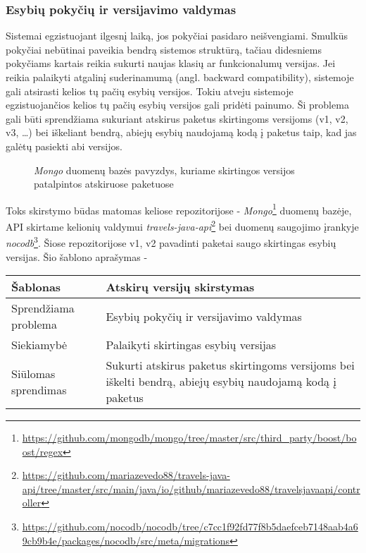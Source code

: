 \subsubsection{Esybių pokyčių ir versijavimo valdymas}
Sistemai egzistuojant ilgesnį laiką, jos pokyčiai pasidaro neišvengiami.
Smulkūs pokyčiai nebūtinai paveikia bendrą sistemos struktūrą, tačiau
didesniems pokyčiams kartais reikia sukurti naujas klasių ar funkcionalumų versijas. Jei reikia palaikyti atgalinį
suderinamumą (angl. backward compatibility), sistemoje gali atsirasti kelios tų pačių esybių versijos.
Tokiu atveju sistemoje egzistuojančios kelios tų pačių esybių versijos gali pridėti painumo.
Ši problema gali būti sprendžiama sukuriant atskirus paketus skirtingoms
versijoms (v1, v2, v3, \ldots) bei iškeliant bendrą, abiejų esybių naudojamą kodą į paketus taip, kad jas galėtų pasiekti abi versijos.
\begin{figure}[H]
    \snugshade
    \endsnugshade
    \caption{\textit{Mongo} duomenų bazės pavyzdys, kuriame skirtingos versijos patalpintos atskiruose paketuose}
\end{figure}
Toks skirstymo būdas matomas keliose repozitorijose - \textit{Mongo}\footnote{\url{https://github.com/mongodb/mongo/tree/master/src/third_party/boost/boost/regex}} duomenų bazėje,
API skirtame kelionių valdymui \textit{travels-java-api}\footnote{\url{https://github.com/mariazevedo88/travels-java-api/tree/master/src/main/java/io/github/mariazevedo88/travelsjavaapi/controller}}
 bei duomenų saugojimo įrankyje \textit{nocodb}\footnote{\url{https://github.com/nocodb/nocodb/tree/c7cc1f92fd77f8b5daefceb7148aab4a69cb9b4e/packages/nocodb/src/meta/migrations}}.
Šiose repozitorijose v1, v2 pavadinti paketai saugo skirtingas esybių versijas.
Šio šablono aprašymas -
\begin{center}
    \begin{tabular}{|p{5cm}|p{10cm}|}
        \hline
        Šablonas &  Atskirų versijų skirstymas \\ [0.5ex]
        \hline\hline
        Sprendžiama problema & Esybių pokyčių ir versijavimo valdymas\\
        \hline
        Siekiamybė &  Palaikyti skirtingas esybių versijas \\
        \hline
        Siūlomas sprendimas & Sukurti atskirus paketus skirtingoms versijoms bei iškelti bendrą, abiejų esybių naudojamą kodą į paketus \\
        \hline
    \end{tabular}
\end{center}



